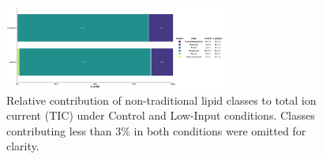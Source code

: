\documentclass[10pt,letterpaper]{article}
\begin{document}







\begin{figure}[htp]
  \centering
  \includegraphics[width=0.65\textwidth]{fig/supp/SuppFig_4_TIC_nontraditional_lipid_class.png}
  \caption{Relative contribution of non-traditional lipid classes to total ion current (TIC) under Control and Low-Input conditions. Classes contributing less than 3\% in both conditions were omitted for clarity.}
  \label{fig:S4_TIC_nontraditional}
\end{figure}
\end{document}
